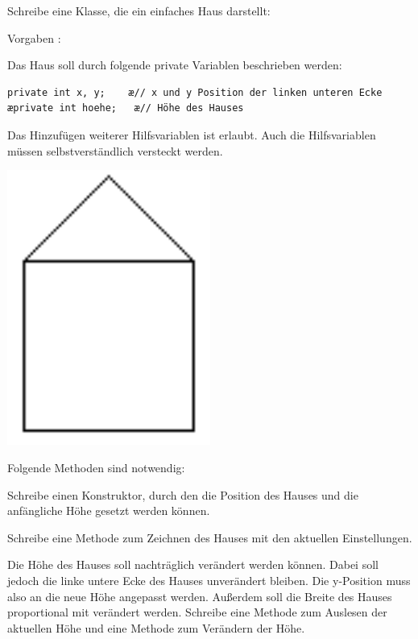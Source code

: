 \begin{compactenum}[a)]
\begin{minipage}{0.75\textwidth}
\item Schreibe eine Klasse, die ein einfaches Haus darstellt:

Vorgaben :

Das Haus soll durch folgende private Variablen beschrieben werden:

\begin{lstlisting}
private int x, y;    æ// x und y Position der linken unteren Ecke
æprivate int hoehe;   æ// Höhe des Hauses
\end{lstlisting}

Das Hinzufügen weiterer Hilfsvariablen ist erlaubt. Auch die Hilfsvariablen
müssen selbstverständlich versteckt werden.
\end{minipage}
\begin{minipage}{0.25\textwidth}
\begin{center}
\includegraphics[width=0.5\textwidth]{./inf/SEKII/12_Java_Datenkapselung/haus.png}
\end{center}
\end{minipage}

\vspace{3mm}

Folgende Methoden sind notwendig:

\begin{compactenum}[1)]
\item Schreibe einen Konstruktor, durch den die Position des Hauses und die
anfängliche Höhe gesetzt werden können.
\item Schreibe eine Methode zum Zeichnen des Hauses mit den aktuellen
Einstellungen.
\item Die Höhe des Hauses soll nachträglich verändert werden können. Dabei soll
jedoch die linke untere Ecke des Hauses unverändert bleiben. Die y-Position
muss also an die neue Höhe angepasst werden. Außerdem soll die Breite des
Hauses proportional mit verändert werden. Schreibe eine Methode zum Auslesen
der aktuellen Höhe und eine Methode zum Verändern der Höhe.
\end{compactenum}


\end{compactenum}
